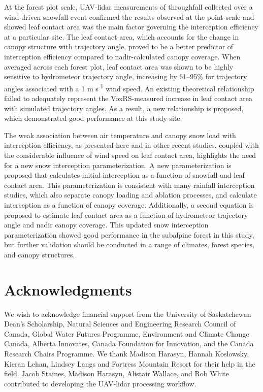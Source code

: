 \documentclass[
  letterpaper,
  DIV=11,
  numbers=noendperiod]{scrartcl}
\begin{document}
At the forest plot scale, UAV-lidar measurements of throughfall
collected over a wind-driven snowfall event confirmed the results
observed at the point-scale and showed leaf contact area was the main
factor governing the interception efficiency at a particular site. The
leaf contact area, which accounts for the change in canopy structure
with trajectory angle, proved to be a better predictor of interception
efficiency compared to nadir-calculated canopy coverage. When averaged
across each forest plot, leaf contact area was shown to be highly
sensitive to hydrometeor trajectory angle, increasing by 61--95\% for
trajectory angles associated with a 1 m s\textsuperscript{-1} wind
speed. An existing theoretical relationship failed to adequately
represent the VoxRS-measured increase in leaf contact area with
simulated trajectory angles. As a result, a new relationship is
proposed, which demonstrated good performance at this study site.

The weak association between air temperature and canopy snow load with
interception efficiency, as presented here and in other recent studies,
coupled with the considerable influence of wind speed on leaf contact
area, highlights the need for a new snow interception parameterization.
A new parameterization is proposed that calculates initial interception
as a function of snowfall and leaf contact area. This parameterization
is consistent with many rainfall interception studies, which also
separate canopy loading and ablation processes, and calculate
interception as a function of canopy coverage. Additionally, a second
equation is proposed to estimate leaf contact area as a function of
hydrometeor trajectory angle and nadir canopy coverage. This updated
snow interception parameterization showed good performance in the
subalpine forest in this study, but further validation should be
conducted in a range of climates, forest species, and canopy structures.

\section{Acknowledgments}\label{acknowledgments}

We wish to acknowledge financial support from the University of
Saskatchewan Dean's Scholarship, Natural Sciences and Engineering
Research Council of Canada, Global Water Futures Programme, Environment
and Climate Change Canada, Alberta Innovates, Canada Foundation for
Innovation, and the Canada Research Chairs Programme. We thank Madison
Harasyn, Hannah Koslowsky, Kieran Lehan, Lindsey Langs and Fortress
Mountain Resort for their help in the field. Jacob Staines, Madison
Harasyn, Alistair Wallace, and Rob White contributed to developing the
UAV-lidar processing workflow.
\end{document}
